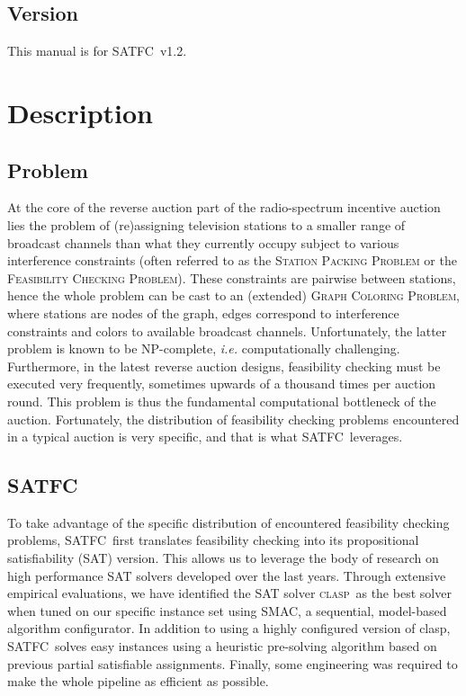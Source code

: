 \documentclass[
10pt, %
letterpaper, %
oneside, %
headinclude,footinclude, %
BCOR5mm, %
needspace, %
]{scrartcl}
\newcommand{\SATFC}{\textsc{SATFC}~}
\newcommand{\clasp}{\textsc{clasp}~}
\begin{document}
\subsection{Version}
This manual is for \SATFC v1.2.

\section{Description}

\subsection{Problem}
At the core of the reverse auction part of the radio-spectrum incentive auction lies the problem of (re)assigning television stations to a smaller range of broadcast channels than what they currently occupy subject to various interference constraints (often referred to as the \textsc{Station Packing Problem} or the \textsc{Feasibility Checking Problem}). These constraints are pairwise between stations, hence the whole problem can be cast to an (extended) \textsc{Graph Coloring Problem}, where stations are nodes of the graph, edges correspond to interference constraints and colors to available broadcast channels. Unfortunately, the latter problem is known to be {NP}-complete, \emph{i.e.} computationally challenging. Furthermore, in the latest reverse auction designs, feasibility checking must be executed very frequently, sometimes upwards of a thousand times per auction round. This problem is thus the fundamental computational bottleneck of the auction. Fortunately, the distribution of feasibility checking problems encountered in a typical auction is very specific, and that is what \SATFC leverages.

\subsection{\SATFC}
To take advantage of the specific distribution of encountered feasibility checking problems, \SATFC first translates feasibility checking into its propositional satisfiability (SAT) version. This allows us to leverage the body of research on high performance SAT solvers developed over the last years. Through extensive empirical evaluations, we have identified the SAT solver \clasp as the best solver when tuned on our specific instance set using SMAC, a sequential, model-based algorithm configurator. In addition to using a highly configured version of clasp, \SATFC solves easy instances using a heuristic pre-solving algorithm based on previous partial satisfiable assignments. Finally, some engineering was required to make the whole pipeline as efficient as possible.
\end{document}
